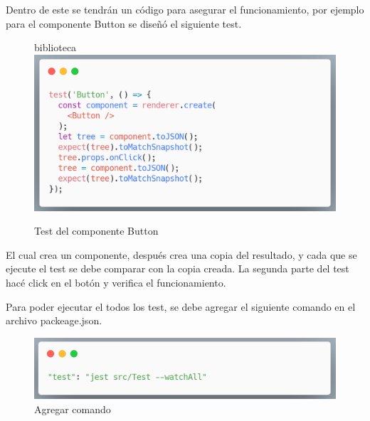  Dentro de este se tendrán un código para asegurar el funcionamiento, por ejemplo para el componente Button se diseñó el siguiente test.
 \newline
\begin{figure}[H]biblioteca
    \includegraphics[width=1\textwidth]{./Imagenes/8.41t.png}
    \caption[Test del componente Button]{Test del componente Button}
    \end{figure}
\newline

El cual crea un componente, después crea una copia del resultado, y cada que se ejecute el test se debe comparar con la copia creada.
La segunda parte del test hacé click en el botón y verifica el funcionamiento.

Para poder ejecutar el todos los test, se debe agregar el siguiente comando en el archivo packeage.json.
 \newline
\begin{figure}[H]
    \includegraphics[width=1\textwidth]{./Imagenes/8.42t.png}
    \caption[Agregar comando]{Agregar comando}
    \end{figure}
\newline
\clearpage